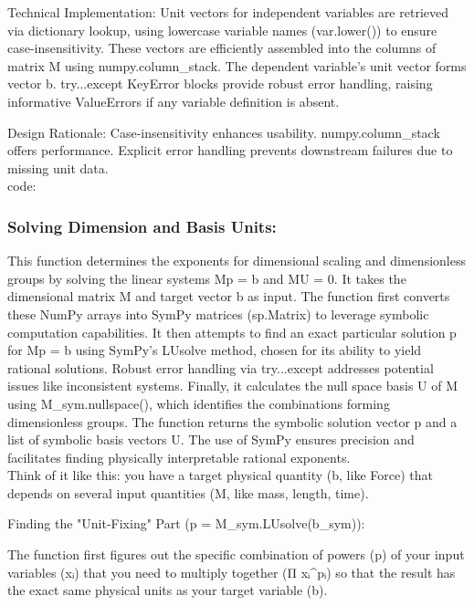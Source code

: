 \documentclass{article}
\begin{document}
Technical Implementation: Unit vectors for independent variables are retrieved via dictionary lookup, using lowercase variable names (var.lower()) to ensure case-insensitivity. These vectors are efficiently assembled into the columns of matrix M using numpy.column_stack. The dependent variable's unit vector forms vector b. try...except KeyError blocks provide robust error handling, raising informative ValueErrors if any variable definition is absent.

Design Rationale: Case-insensitivity enhances usability. numpy.column_stack offers performance. Explicit error handling prevents downstream failures due to missing unit data.\\


code: \\

\subsubsection{Solving Dimension and Basis Units: }

This function determines the exponents for dimensional scaling and dimensionless groups by solving the linear systems Mp = b and MU = 0. It takes the dimensional matrix M and target vector b as input. The function first converts these NumPy arrays into SymPy matrices (sp.Matrix) to leverage symbolic computation capabilities. It then attempts to find an exact particular solution p for Mp = b using SymPy's LUsolve method, chosen for its ability to yield rational solutions. Robust error handling via try...except addresses potential issues like inconsistent systems. Finally, it calculates the null space basis U of M using M_sym.nullspace(), which identifies the combinations forming dimensionless groups. The function returns the symbolic solution vector p and a list of symbolic basis vectors U. The use of SymPy ensures precision and facilitates finding physically interpretable rational exponents.\\

Think of it like this: you have a target physical quantity (b, like Force) that depends on several input quantities (M, like mass, length, time).

    Finding the "Unit-Fixing" Part (p = M_sym.LUsolve(b_sym)):

        The function first figures out the specific combination of powers (p) of your input variables (xᵢ) that you need to multiply together (Π xᵢ^pᵢ) so that the result has the exact same physical units as your target variable (b).
\end{document}
